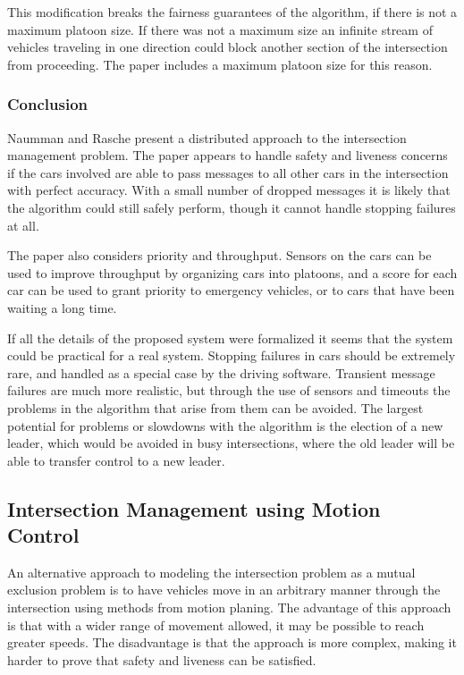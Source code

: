 \documentclass[12pt]{article}
\begin{document}
This modification breaks the fairness guarantees of the algorithm, if there is not a maximum platoon size. If there was not a maximum size an infinite stream of vehicles traveling in one direction could block another section of the intersection from proceeding. The paper includes a maximum platoon size for this reason.\par
\subsubsection{Conclusion}
Naumman and Rasche present a distributed approach to the intersection management problem. The paper appears to handle safety and liveness concerns if the cars involved are able to pass messages to all other cars in the intersection with perfect accuracy. With a small number of dropped messages it is likely that the algorithm could still safely perform, though it cannot handle stopping failures at all. \par
The paper also considers priority and throughput. Sensors on the cars can be used to improve throughput by organizing cars into platoons, and a score for each car can be used to grant priority to emergency vehicles, or to cars that have been waiting a long time.\par
If all the details of the proposed system were formalized it seems that the system could be practical for a real system. Stopping failures in cars should be extremely rare, and handled as a special case by the driving software. Transient message failures are much more realistic, but through the use of sensors and timeouts the problems in the algorithm that arise from them can be avoided. The largest potential for problems or slowdowns with the algorithm is the election of a new leader, which would be avoided in busy intersections, where the old leader will be able to transfer control to a new leader. \par

\subsection{Intersection Management using Motion Control}
\label{sec:DNF}
An alternative approach to modeling the intersection problem as a mutual exclusion problem is to have vehicles move in an arbitrary manner through the intersection using methods from motion planing. The advantage of this approach is that with a wider range of movement allowed, it may be possible to reach greater speeds. The disadvantage is that the approach is more complex, making it harder to prove that safety and liveness can be satisfied.\par
\end{document}
